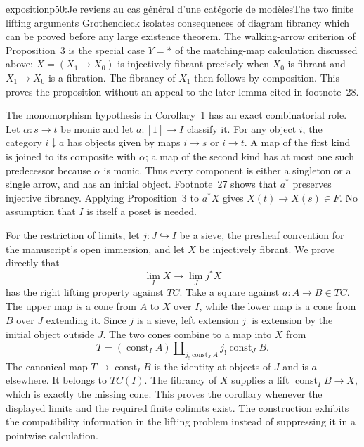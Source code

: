 \begin{dcomment}{exposition}{p50:Je reviens au cas général d'une catégorie de modèles}{The two finite lifting arguments}
Grothendieck isolates consequences of diagram fibrancy which can be proved before any large existence theorem. The walking-arrow criterion of Proposition~3 is the special case $Y=*$ of the matching-map calculation discussed above: $X=(X_1\to X_0)$ is injectively fibrant precisely when $X_0$ is fibrant and $X_1\to X_0$ is a fibration. The fibrancy of $X_1$ then follows by composition. This proves the proposition without an appeal to the later lemma cited in footnote~28.

The monomorphism hypothesis in Corollary~1 has an exact combinatorial role. Let $\alpha:s\to t$ be monic and let $a:[1]\to I$ classify it. For any object $i$, the category $i\downarrow a$ has objects given by maps $i\to s$ or $i\to t$. A map of the first kind is joined to its composite with $\alpha$; a map of the second kind has at most one such predecessor because $\alpha$ is monic. Thus every component is either a singleton or a single arrow, and has an initial object. Footnote~27 shows that $a^*$ preserves injective fibrancy. Applying Proposition~3 to $a^*X$ gives $X(t)\to X(s)\in F$. No assumption that $I$ is itself a poset is needed.

For the restriction of limits, let $j:J\hookrightarrow I$ be a sieve, the presheaf convention for the manuscript's open immersion, and let $X$ be injectively fibrant. We prove directly that
\[
 \lim_I X\longrightarrow\lim_J j^*X
\]
has the right lifting property against $TC$. Take a square against $a:A\to B\in TC$. The upper map is a cone from $A$ to $X$ over $I$, while the lower map is a cone from $B$ over $J$ extending it. Since $j$ is a sieve, left extension $j_!$ is extension by the initial object outside $J$. The two cones combine to a map into $X$ from
\[
 T=(\operatorname{const}_I A)
 \mathbin{\amalg}_{j_!\operatorname{const}_J A}
 j_!\operatorname{const}_J B.
\]
The canonical map $T\to\operatorname{const}_I B$ is the identity at objects of $J$ and is $a$ elsewhere. It belongs to $TC(I)$. The fibrancy of $X$ supplies a lift $\operatorname{const}_I B\to X$, which is exactly the missing cone. This proves the corollary whenever the displayed limits and the required finite colimits exist. The construction exhibits the compatibility information in the lifting problem instead of suppressing it in a pointwise calculation.
\end{dcomment}


